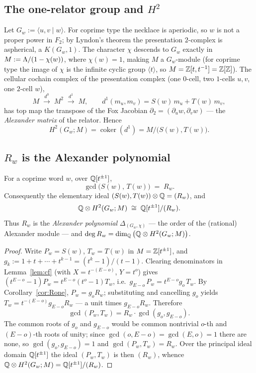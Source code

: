 \subsection*{The one-relator group and $H^2$}

Let $G_w:=\langle u,v\mid w\rangle$. For coprime type the necklace is aperiodic, so $w$ is not a
proper power in $F_2$; by Lyndon's theorem the presentation $2$-complex is aspherical, a
$K(G_w,1)$. The character $\chi$ descends to $G_w$ exactly in $M:=\Lambda/(1-\chi(w))$, where
$\chi(w)=1$, making $M$ a $G_w$-module (for coprime type the image of $\chi$ is the infinite
cyclic group $\langle t\rangle$, so $M=\mathbb{Z}[t,t^{-1}]=\mathbb{Z}[\mathbb{Z}]$). The cellular cochain complex of the
presentation complex (one $0$-cell, two $1$-cells $u,v$, one $2$-cell $w$),
\[
   M\;\xrightarrow{\ d^0\ }\;M^2\;\xrightarrow{\ d^1\ }\;M,\qquad
   d^1(m_u,m_v)=S(w)\,m_u+T(w)\,m_v,
\]
has top map the transpose of the Fox Jacobian $\partial_2=(\partial_u w,\partial_v w)$ --- the
\emph{Alexander matrix} of the relator. Hence
\[
   H^2(G_w;M)=\operatorname{coker}(d^1)=M/\big(S(w),T(w)\big).
\]

\subsection*{$R_w$ is the Alexander polynomial}

\begin{thm}\label{thm:alex}
For a coprime word $w$, over $\mathbb{Q}[t^{\pm1}]$,
\[
   \gcd\big(S(w),\,T(w)\big)\;=\;R_w .
\]
Consequently the elementary ideal $(S(w),T(w))\otimes\mathbb{Q}=(R_w)$, and
\[
   \mathbb{Q}\otimes H^2(G_w;M)\;\cong\;\mathbb{Q}[t^{\pm1}]/(R_w).
\]
Thus $R_w$ is the \emph{Alexander polynomial} $\Delta_{(G_w,\chi)}$ --- the order of the
(rational) Alexander module --- and $\deg R_w=\dim_{\mathbb{Q}}\big(\mathbb{Q}\otimes H^2(G_w;M)\big)$.
\end{thm}

\begin{proof}
Write $P_w=S(w)$, $T_w=T(w)$ in $M=\mathbb{Z}[t^{\pm1}]$, and $g_k:=1+t+\cdots+t^{k-1}=(t^k-1)/(t-1)$.
Clearing denominators in Lemma~\ref{lem:cf} (with $X=t^{-(E-o)}$, $Y=t^{o}$) gives
$(t^{E-o}-1)P_w=t^{E-o}(t^{o}-1)T_w$, i.e.\ $g_{E-o}\,P_w=t^{E-o}g_o\,T_w$. By
Corollary~\ref{cor:Rone}, $P_w=g_o R_w$; substituting and cancelling $g_o$ yields
$T_w=t^{-(E-o)}g_{E-o}R_w$ --- a unit times $g_{E-o}R_w$. Therefore
\[
   \gcd(P_w,T_w)=R_w\cdot\gcd(g_o,g_{E-o}).
\]
The common roots of $g_o$ and $g_{E-o}$ would be common nontrivial $o$-th and $(E-o)$-th roots
of unity; since $\gcd(o,E-o)=\gcd(E,o)=1$ there are none, so $\gcd(g_o,g_{E-o})=1$ and
$\gcd(P_w,T_w)=R_w$. Over the principal ideal domain $\mathbb{Q}[t^{\pm1}]$ the ideal $(P_w,T_w)$ is then
$(R_w)$, whence $\mathbb{Q}\otimes H^2(G_w;M)=\mathbb{Q}[t^{\pm1}]/(R_w)$.
\end{proof}

